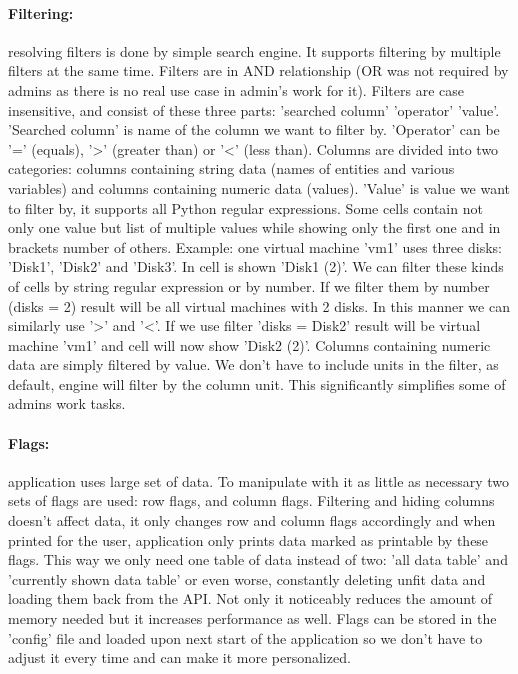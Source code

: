 \paragraph{Filtering:}
resolving filters is done by simple search engine. It supports filtering by multiple filters at the same time. Filters are in AND relationship (OR was not required by admins as there is no real use case in admin's work for it). Filters are case insensitive, and consist of these three parts: 'searched column' 'operator' 'value'. 'Searched column' is name of the column we want to filter by. 'Operator' can be '=' (equals), '>' (greater than) or '<' (less than). Columns are divided into two categories: columns containing string data (names of entities and various variables) and columns containing numeric data (values). 'Value' is value we want to filter by, it supports all Python regular expressions. Some cells contain not only one value but list of multiple values while showing only the first one and in brackets number of others. Example: one virtual machine 'vm1' uses three disks: 'Disk1', 'Disk2' and 'Disk3'. In cell is shown 'Disk1 (2)'. We can filter these kinds of cells by string regular expression or by number. If we filter them by number (disks = 2) result will be all virtual machines with 2 disks. In this manner we can similarly use '>' and '<'.  If we use filter 'disks = Disk2' result will be virtual machine 'vm1' and cell will now show 'Disk2 (2)'. Columns containing numeric data are simply filtered by value. We don't have to include units in the filter, as default, engine will filter by the column unit. This significantly simplifies some of admins work tasks.

\paragraph{Flags:}
application uses large set of data. To manipulate with it as little as necessary two sets of flags are used: row flags, and column flags. Filtering and hiding columns doesn't affect data, it only changes row and column flags accordingly and when printed for the user, application only prints data marked as printable by these flags. This way we only need one table of data instead of two: 'all data table' and 'currently shown data table' or even worse, constantly deleting unfit data and loading them back from the API. Not only it noticeably reduces the amount of memory needed but it increases performance as well. Flags can be stored in the 'config' file and loaded upon next start of the application so we don't have to adjust it every time and can make it more personalized.

